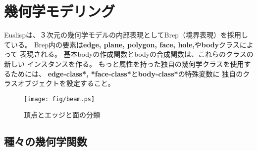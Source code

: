 \section{\label{Geometry}幾何学モデリング}

Euslispは、３次元の幾何学モデルの内部表現として{\emx Brep}（境界表現）を採用している。
Brep内の要素は{\bf edge, plane, polygon, face, hole,}や{\bf body}クラスによって
表現される。
基本bodyの作成関数とbodyの合成関数は、これらのクラスの新しい
インスタンスを作る。
もっと属性を持った独自の幾何学クラスを使用するためには、
{\bf *edge-class*, *face-class*}と{\bf *body-class*}の特殊変数に
独自のクラスオブジェクトを設定すること。

\begin{figure}
\begin{center}
\texttt{[image: fig/beam.ps]}
\end{center}
\caption{頂点とエッジと面の分類}
\end{figure}

\subsection{種々の幾何学関数}

